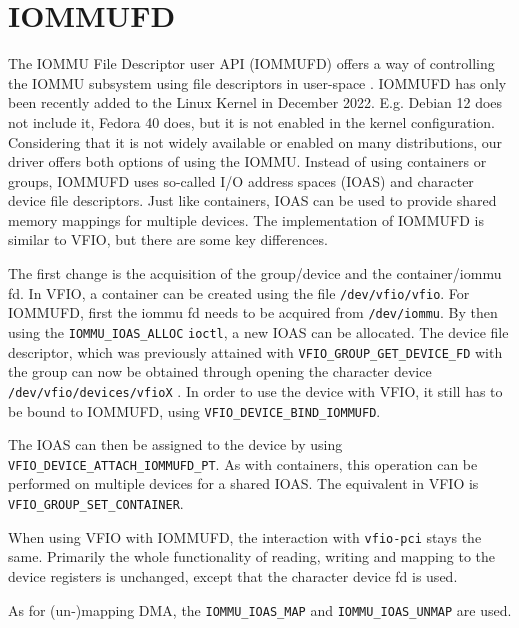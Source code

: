 \section{IOMMUFD}
The IOMMU File Descriptor user API (IOMMUFD) offers a way of controlling the IOMMU subsystem using file descriptors in user-space \cite{iommufdkerneldocs}.
IOMMUFD has only been recently added to the Linux Kernel in December 2022. E.g. Debian 12 does not include it, Fedora 40 does, but it is not enabled in the kernel configuration. Considering that it is not widely available or enabled on many distributions, our driver offers both options of using the IOMMU.
Instead of using containers or groups, IOMMUFD uses so-called I/O address spaces (IOAS) and character device file descriptors. Just like containers, IOAS can be used to provide shared memory mappings for multiple devices. The implementation of IOMMUFD is similar to VFIO, but there are some key differences.

The first change is the acquisition of the group/device and the container/iommu fd.
In VFIO, a container can be created using the file \texttt{/dev/vfio/vfio}. For IOMMUFD, first the iommu fd needs to be acquired from \texttt{/dev/iommu}. By then using the \texttt{IOMMU\_IOAS\_ALLOC} \texttt{ioctl}, a new IOAS can be allocated.
The device file descriptor, which was previously attained with \texttt{VFIO\_GROUP\_GET\_DEVICE\_FD} with the group can now be obtained through opening the character device \texttt{/dev/vfio/devices/vfioX} \cite{vfiokerneldocs}. In order to use the device with VFIO, it still has to be bound to IOMMUFD, using \texttt{VFIO\_DEVICE\_BIND\_IOMMUFD}.


The IOAS can then be assigned to the device by using \texttt{VFIO\_DEVICE\_ATTACH\_IOMMUFD\_PT}. As with containers, this operation can be performed on multiple devices for a shared IOAS. The equivalent in VFIO is \texttt{VFIO\_GROUP\_SET\_CONTAINER}.

When using VFIO with IOMMUFD, the interaction with \texttt{vfio-pci} stays the same. Primarily the whole functionality of reading, writing and mapping to the device registers is unchanged, except that the character device fd is used.

As for (un-)mapping DMA, the \texttt{IOMMU\_IOAS\_MAP} and \texttt{IOMMU\_IOAS\_UNMAP} are used.


